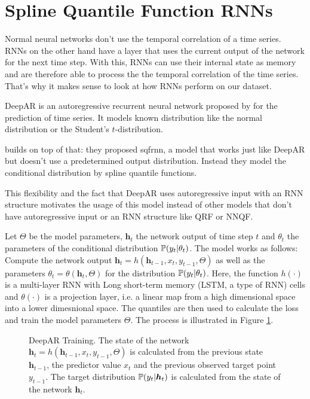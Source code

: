 \section{Spline Quantile Function RNNs}
\label{sec:sqf-rnn}

Normal neural networks don't use the temporal correlation of a time series. 
RNNs on the other hand have a layer that uses the current output of the network for the 
next time step. With this, RNNs can use their internal state as memory and 
are therefore able to process the the temporal correlation of the time series. 
That's why it makes sense to look at how RNNs perform on our dataset.

DeepAR is an autoregressive recurrent neural network proposed by 
\Textcite{Salinas2017} for the prediction of time series. It models 
known distribution like the normal distribution or the Student's \(t\)-distribution. 

\Textcite{Gasthaus2019} builds on top of that: they proposed \gls{sqfrnn}, 
a model that works just like DeepAR but doesn't use a predetermined output 
distribution. Instead they model the conditional distribution 
by spline quantile functions. 

This flexibility and the fact that DeepAR uses autoregressive input with an RNN structure 
motivates the usage of this model instead of other models that don't 
have autoregressive input or an RNN structure like QRF or NNQF.

Let \(\Theta\) be the model parameters, \(\boldsymbol{h}_t\) the network output of 
time step \(t\) and \(\theta_t\) the parameters of the conditional distribution \(\P(y_t | \theta_t)\).
The model works as follows:
Compute the network output \(\boldsymbol{h}_t = h(\boldsymbol{h}_{t-1}, x_t, y_{t-1}, \Theta)\) 
as well as the parameters \(\theta_t = \theta(\boldsymbol{h}_t, \Theta)\) for the distribution
\(\P(y_t | \theta_t)\). Here, the function \(h(\cdot)\) is a multi-layer RNN with 
Long short-term memory (LSTM, a type of RNN) cells and \(\theta(\cdot)\) is a projection layer, 
i.e. a linear map from a high dimensional space into a lower dimesnional space. 
The quantiles are then used to calculate the loss and train the model parameters \(\Theta\).
The process is illustrated in Figure \ref{fig:deepar-training}. 

\begin{figure}[h]%
    \centering
    
    \caption[DeepAR Training]{DeepAR Training. 
    The state of the network \(\boldsymbol{h}_t = h(\boldsymbol{h}_{t-1}, x_t, y_{t-1}, \Theta)\) 
    is calculated from the previous state \(\boldsymbol{h}_{t-1}\), 
    the predictor value \(x_t\) and the previous observed target point \(y_{t-1}\). 
    The target distribution \(\P(y_t | \boldsymbol{h}_t)\) 
    is calculated from the state of the network \(\boldsymbol{h}_t\).}%
    \label{fig:deepar-training}%
\end{figure}

